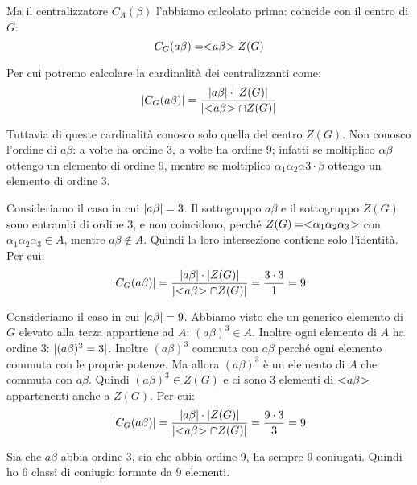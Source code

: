 \begin{soluzione}
    Ma il centralizzatore $C_A(\beta)$ l'abbiamo calcolato prima: coincide con il centro di $G$:
    \begin{equation*}
        C_G(a\beta) = < \negmedspace a\beta \negmedspace > Z(G)
    \end{equation*}

    Per cui potremo calcolare la cardinalità dei centralizzanti come:
    \begin{equation*}
        \lvert C_G(a\beta) \rvert = \dfrac{\lvert a\beta \rvert \cdot \lvert Z(G) \rvert}{\lvert < \negmedspace a\beta \negmedspace > \cap Z(G) \rvert}
    \end{equation*}

    Tuttavia di queste cardinalità conosco solo quella del centro $Z(G)$.
    Non conosco l'ordine di $a\beta$: a volte ha ordine 3, a volte ha ordine 9;
    infatti se moltiplico $\alpha\beta$ ottengo un elemento di ordine 9, mentre se moltiplico
    $\alpha_1\alpha_2\alpha3 \cdot \beta$ ottengo un elemento di ordine 3.

    Consideriamo il caso in cui $\lvert a\beta \rvert = 3$.
    Il sottogruppo $a\beta$ e il sottogruppo $Z(G)$ sono entrambi di ordine 3, e non coincidono,
    perché $Z(G) = < \negmedspace \alpha_1\alpha_2\alpha_3 \negmedspace >$ con $\alpha_1\alpha_2\alpha_3 \in A$, mentre $a\beta \not\in A$.
    Quindi la loro intersezione contiene solo l'identità.
    Per cui:
    \begin{equation*}
        \lvert C_G(a\beta) \rvert = \dfrac{\lvert a\beta \rvert \cdot \lvert Z(G) \rvert}{\lvert < \negmedspace a\beta \negmedspace > \cap Z(G) \rvert} =
        \dfrac{3 \cdot 3}{1} = 9
    \end{equation*}

    Consideriamo il caso in cui $\lvert a\beta \rvert = 9$.
    Abbiamo visto che un generico elemento di $G$ elevato alla terza appartiene ad $A$: $(a\beta)^3 \in A$.
    Inoltre ogni elemento di $A$ ha ordine 3: $\lvert (a\beta)^3 = 3 \rvert$.
    Inoltre $(a\beta)^3$ commuta con $a\beta$ perché ogni elemento commuta con le proprie potenze.
    Ma allora $(a\beta)^3$ è un elemento di $A$ che commuta con $a\beta$.
    Quindi $(a\beta)^3 \in Z(G)$ e ci sono 3 elementi di $< \negmedspace a\beta \negmedspace >$ appartenenti anche a $Z(G)$.
    Per cui:
    \begin{equation*}
        \lvert C_G(a\beta) \rvert = \dfrac{\lvert a\beta \rvert \cdot \lvert Z(G) \rvert}{\lvert < \negmedspace a\beta \negmedspace > \cap Z(G) \rvert} =
        \dfrac{9 \cdot 3}{3} = 9
    \end{equation*}

    Sia che $a\beta$ abbia ordine 3, sia che abbia ordine 9, ha sempre 9 coniugati.
    Quindi ho 6 classi di coniugio formate da 9 elementi.
\end{soluzione}